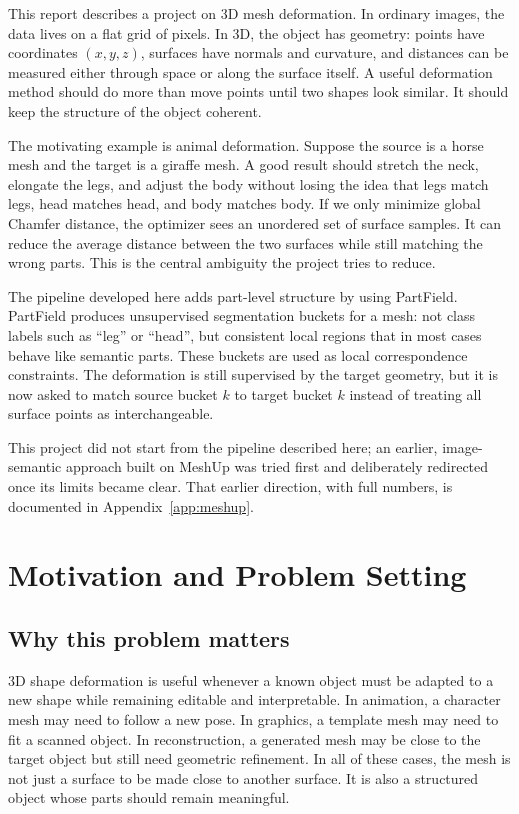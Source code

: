 \documentclass{article}
\begin{document}
This report describes a project on 3D mesh deformation. In ordinary images, the data lives on a
flat grid of pixels. In 3D, the object has geometry: points have coordinates $(x,y,z)$, surfaces
have normals and curvature, and distances can be measured either through space or along the
surface itself. A useful deformation method should do more than move points until two shapes look
similar. It should keep the structure of the object coherent.

The motivating example is animal deformation. Suppose the source is a horse mesh and the target is
a giraffe mesh. A good result should stretch the neck, elongate the legs, and adjust the body without
losing the idea that legs match legs, head matches head, and body matches body. If we only
minimize global Chamfer distance, the optimizer sees an unordered set of surface samples. It can
reduce the average distance between the two surfaces while still matching the wrong parts. This is
the central ambiguity the project tries to reduce.

The pipeline developed here adds part-level structure by using PartField. PartField produces
unsupervised segmentation buckets for a mesh: not class labels such as ``leg'' or ``head'', but
consistent local regions that in most cases behave like semantic parts. These buckets are used as local
correspondence constraints. The deformation is still supervised by the target geometry, but it is
now asked to match source bucket $k$ to target bucket $k$ instead of treating all surface points as
interchangeable.

This project did not start from the pipeline described here; an earlier, image-semantic approach
built on MeshUp was tried first and deliberately redirected once its limits became clear. That
earlier direction, with full numbers, is documented in Appendix~\ref{app:meshup}.

\section{Motivation and Problem Setting}

\subsection{Why this problem matters}

3D shape deformation is useful whenever a known object must be adapted to a new shape while
remaining editable and interpretable. In animation, a character mesh may need to follow a new pose.
In graphics, a template mesh may need to fit a scanned object. In reconstruction, a generated mesh
may be close to the target object but still need geometric refinement. In all of these cases, the
mesh is not just a surface to be made close to another surface. It is also a structured object
whose parts should remain meaningful.
\end{document}
